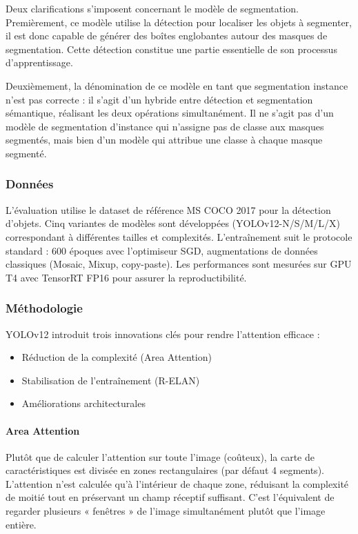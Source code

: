 Deux clarifications s'imposent concernant le modèle de segmentation. Premièrement, ce modèle utilise la détection pour localiser les objets à segmenter, il est donc capable de générer des boîtes englobantes autour des masques de segmentation. Cette détection constitue une partie essentielle de son processus d'apprentissage.

Deuxièmement, la dénomination de ce modèle en tant que segmentation instance n'est pas correcte : il s'agit d'un hybride entre détection et segmentation sémantique, réalisant les deux opérations simultanément. Il ne s'agit pas d'un modèle de segmentation d'instance qui n'assigne pas de classe aux masques segmentés, mais bien d'un modèle qui attribue une classe à chaque masque segmenté.

\subsubsection{Données}
L'évaluation utilise le dataset de référence MS COCO 2017 \cite{coco_coco_nodate} pour la détection d'objets. Cinq variantes de modèles sont développées (YOLOv12-N/S/M/L/X) correspondant à différentes tailles et complexités. L'entraînement suit le protocole standard : 600 époques avec l'optimiseur SGD, augmentations de données classiques (Mosaic, Mixup, copy-paste). Les performances sont mesurées sur GPU T4 avec TensorRT FP16 pour assurer la reproductibilité.

\subsubsection{Méthodologie}
YOLOv12 introduit trois innovations clés pour rendre l'attention efficace :
\begin{itemize}
    \item Réduction de la complexité (Area Attention)
    \item Stabilisation de l'entraînement (R-ELAN)
    \item Améliorations architecturales
\end{itemize}

\paragraph{Area Attention}
Plutôt que de calculer l'attention sur toute l'image (coûteux), la carte de caractéristiques est divisée en zones rectangulaires (par défaut 4 segments). L'attention n'est calculée qu'à l'intérieur de chaque zone, réduisant la complexité de moitié tout en préservant un champ réceptif suffisant. C'est l'équivalent de regarder plusieurs « fenêtres » de l'image simultanément plutôt que l'image entière.

